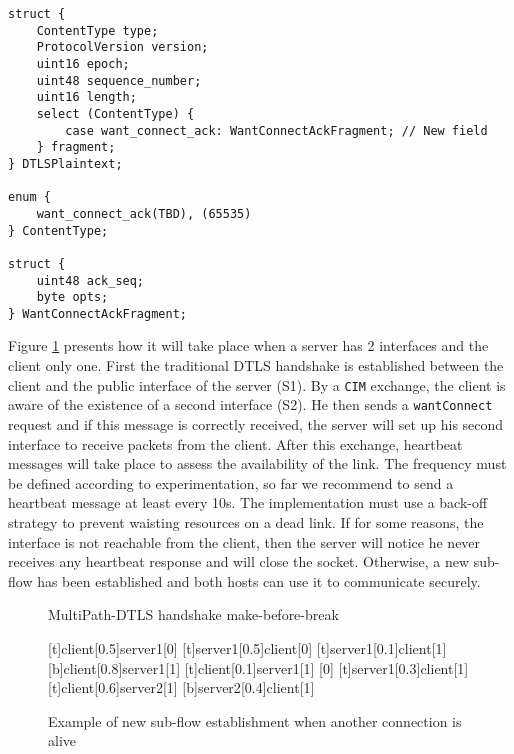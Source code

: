 \begin{lstlisting}[caption= wantConnectAck message structure, label=lst:WantConnectAck]
struct {
    ContentType type;
    ProtocolVersion version;
    uint16 epoch;
    uint48 sequence_number;
    uint16 length;
    select (ContentType) {
        case want_connect_ack: WantConnectAckFragment; // New field
    } fragment;
} DTLSPlaintext;

enum {
    want_connect_ack(TBD), (65535)
} ContentType;

struct {
    uint48 ack_seq;
    byte opts;
} WantConnectAckFragment;
\end{lstlisting}

Figure \ref{fig:Handshake1} presents how it will take place when a server has 2 interfaces and the client only one. First the traditional DTLS handshake is established between the client and the public interface of the server (S1). By a \texttt{CIM} exchange, the client is aware of the existence of a second interface (S2). He then sends a \texttt{wantConnect} request and if this message is correctly received, the server will set up his second interface to receive packets from the client. After this exchange, heartbeat messages will take place to assess the availability of the link. The frequency must be defined according to experimentation, so far we recommend to send a heartbeat message at least every 10s. The implementation must use a back-off strategy to prevent waisting resources on a dead link. If for some reasons, the interface is not reachable from the client, then the server will notice he never receives any heartbeat response and will close the socket. Otherwise, a new sub-flow has been established and both hosts can use it to communicate securely. 


\begin{figure}[!h]
\centering
\begin{msc}[r]{MultiPath-DTLS handshake make-before-break}

\setlength{\instfootheight}{0em}
\setlength{\instheadheight}{0em}
\setlength{\instdist}{0.33\linewidth}
\setlength{\levelheight}{3em}


[t]{client}[0.5]{server1}[0]
\nextlevel
{}[t]{server1}[0.5]{client}[0]
\nextlevel
{}[t]{server1}[0.1]{client}[1]
\nextlevel
{}[b]{client}[0.8]{server1}[1]
\nextlevel[2]
[t]{client}[0.1]{server1}[1]
\nextlevel
{}
[0]
[t]{server1}[0.3]{client}[1]
\nextlevel
{}
\nextlevel
{}[t]{client}[0.6]{server2}[1]
\nextlevel
{}[b]{server2}[0.4]{client}[1]
\nextlevel[2]

\end{msc}
\caption{Example of new sub-flow establishment when another connection is alive}
\label{fig:Handshake1}
\end{figure}

